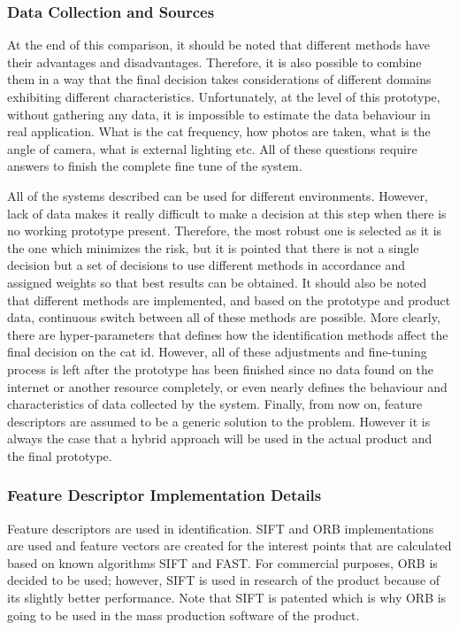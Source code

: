 \subsubsection{Data Collection and Sources}
At the end of this comparison, it should be noted that different methods have their advantages and disadvantages. Therefore, it is also possible to combine them in a way that the final decision takes considerations of different domains exhibiting different characteristics. Unfortunately, at the level of this prototype, without gathering any data, it is impossible to estimate the data behaviour in real application. What is the cat frequency, how photos are taken, what is the angle of camera, what is external lighting etc. All of these questions require answers to finish the complete fine tune of the system.

All of the systems described can be used for different environments. However, lack of data makes it really difficult to make a decision at this step when there is no working prototype present. Therefore, the most robust one is selected as it is the one which minimizes the risk, but it is pointed that there is not a single decision but a set of decisions to use different methods in accordance and assigned weights so that best results can be obtained. It should also be noted that different methods are implemented, and based on the prototype and product data, continuous switch between all of these methods are possible. More clearly, there are hyper-parameters that defines how the identification methods affect the final decision on the cat id. However, all of these adjustments and fine-tuning process is left after the prototype has been finished since no data found on the internet or another resource completely, or even nearly defines the behaviour and characteristics of data collected by the system. Finally, from now on, feature descriptors are assumed to be a generic solution to the problem. However it is always the case that a hybrid approach will be used in the actual product and the final prototype.

\subsubsection{Feature Descriptor Implementation Details}
Feature descriptors are used in identification. SIFT and ORB implementations are used and feature vectors are created for the interest points that are calculated based on known algorithms SIFT and FAST. For commercial purposes, ORB is decided to be used; however, SIFT is used in research of the product because of its slightly better performance. Note that SIFT is patented which is why ORB is going to be used in the mass production software of the product.


